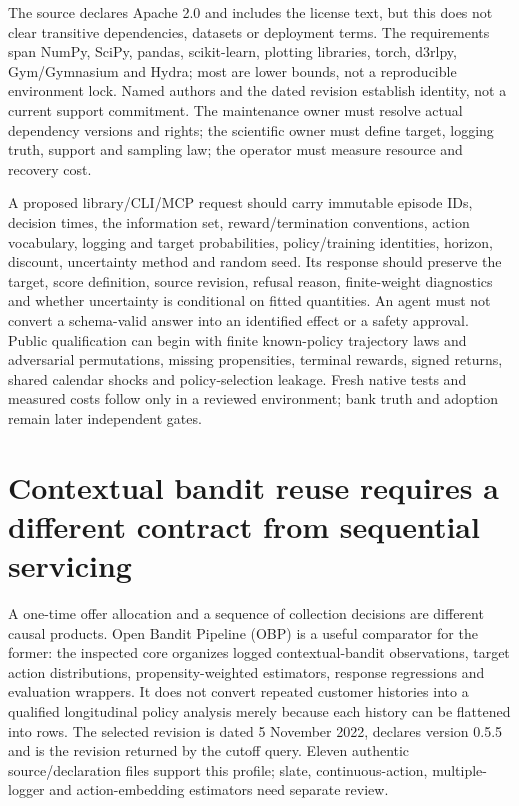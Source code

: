 The source declares Apache 2.0 and includes the license text, but this does not
clear transitive dependencies, datasets or deployment terms. The requirements
span NumPy, SciPy, pandas, scikit-learn, plotting libraries, torch, d3rlpy,
Gym/Gymnasium and Hydra; most are lower bounds, not a reproducible environment
lock. Named authors and the dated revision establish identity, not a current
support commitment. The maintenance owner must resolve actual dependency
versions and rights; the scientific owner must define target, logging truth,
support and sampling law; the operator must measure resource and recovery cost.
\citep{exec23_scope_rl_sources}

A proposed library/CLI/MCP request should carry immutable episode IDs, decision
times, the information set, reward/termination conventions, action vocabulary,
logging and target probabilities, policy/training identities, horizon, discount,
uncertainty method and random seed. Its response should preserve the target,
score definition, source revision, refusal reason, finite-weight diagnostics and
whether uncertainty is conditional on fitted quantities. An agent must not
convert a schema-valid answer into an identified effect or a safety approval.
Public qualification can begin with finite known-policy trajectory laws and
adversarial permutations, missing propensities, terminal rewards, signed returns,
shared calendar shocks and policy-selection leakage. Fresh native tests and
measured costs follow only in a reviewed environment; bank truth and adoption
remain later independent gates.


\section{Contextual bandit reuse requires a different contract from sequential servicing}
\label{exec23:obp-scope}
A one-time offer allocation and a sequence of collection decisions are different
causal products. Open Bandit Pipeline (OBP) is a useful comparator for the former:
the inspected core organizes logged contextual-bandit observations, target
action distributions, propensity-weighted estimators, response regressions and
evaluation wrappers. It does not convert repeated customer histories into a
qualified longitudinal policy analysis merely because each history can be
flattened into rows. The selected revision is dated 5 November 2022, declares
version 0.5.5 and is the revision returned by the cutoff query. Eleven authentic
source/declaration files support this profile; slate, continuous-action,
multiple-logger and action-embedding estimators need separate review.
\citep{exec23_obp_sources}

